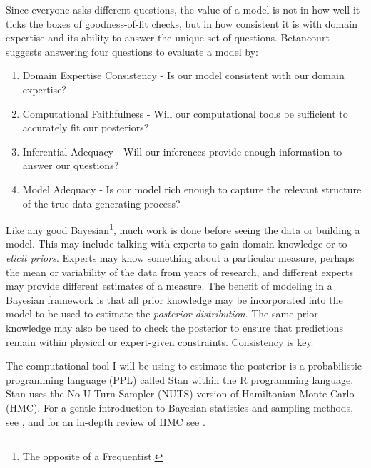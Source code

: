 \documentclass[11pt, oneside, openany]{scrbook}
\providecommand{\tightlist}{%
  \setlength{\itemsep}{0pt}\setlength{\parskip}{0pt}}
\begin{document}
Since everyone asks different questions, the value of a model is not in how well it ticks the boxes of goodness-of-fit checks, but in how consistent it is with domain expertise and its ability to answer the unique set of questions. Betancourt suggests answering four questions to evaluate a model by:

\begin{enumerate}
\def\labelenumi{\arabic{enumi}.}
\tightlist
\item
  Domain Expertise Consistency - Is our model consistent with our domain expertise?
\item
  Computational Faithfulness - Will our computational tools be sufficient to accurately fit our posteriors?
\item
  Inferential Adequacy - Will our inferences provide enough information to answer our questions?
\item
  Model Adequacy - Is our model rich enough to capture the relevant structure of the true data generating process?
\end{enumerate}

Like any good Bayesian\footnote{The opposite of a Frequentist.}, much work is done before seeing the data or building a model. This may include talking with experts to gain domain knowledge or to \emph{elicit priors}. Experts may know something about a particular measure, perhaps the mean or variability of the data from years of research, and different experts may provide different estimates of a measure. The benefit of modeling in a Bayesian framework is that all prior knowledge may be incorporated into the model to be used to estimate the \emph{posterior distribution}. The same prior knowledge may also be used to check the posterior to ensure that predictions remain within physical or expert-given constraints. Consistency is key.

The computational tool I will be using to estimate the posterior is a probabilistic programming language (PPL) called Stan \citep{R-rstan} within the R programming language. Stan uses the No U-Turn Sampler (NUTS) version of Hamiltonian Monte Carlo (HMC). For a gentle introduction to Bayesian statistics and sampling methods, see \citet{bolstad2016introduction}, and for an in-depth review of HMC see \citet{betancourt2017conceptual}.
\end{document}
